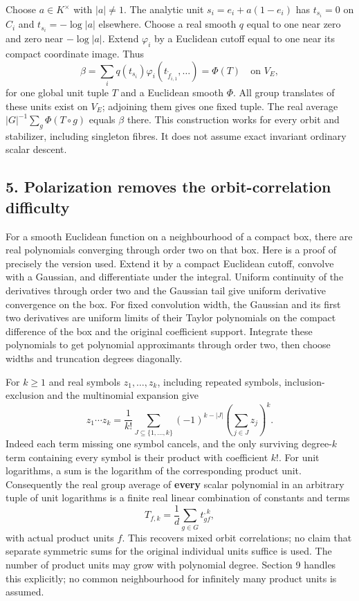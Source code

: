 \documentclass[
  11pt,
]{article}
\begin{document}
Choose \(a\in K^\times\) with \(|a|\ne1\). The analytic unit
\(s_i=e_i+a(1-e_i)\) has \(t_{s_i}=0\) on \(C_i\) and
\(t_{s_i}=-\log|a|\) elsewhere. Choose a real smooth \(q\) equal to one
near zero and zero near \(-\log|a|\). Extend \(\varphi_i\) by a
Euclidean cutoff equal to one near its compact coordinate image. Thus \[
 \beta=\sum_i q(t_{s_i})\varphi_i(t_{\widetilde f_{i,1}},\ldots)
                          =\Phi(T)\quad\text{on }V_E,   \tag{8}
\] for one global unit tuple \(T\) and a Euclidean smooth \(\Phi\). All
group translates of these units exist on \(V_E\); adjoining them gives
one fixed tuple. The real average \(|G|^{-1}\sum_g\Phi(T\circ g)\)
equals \(\beta\) there. This construction works for every orbit and
stabilizer, including singleton fibres. It does not assume exact
invariant ordinary scalar descent.

\subsection{5. Polarization removes the orbit-correlation
difficulty}\label{polarization-removes-the-orbit-correlation-difficulty}

For a smooth Euclidean function on a neighbourhood of a compact box,
there are real polynomials converging through order two on that box.
Here is a proof of precisely the version used. Extend it by a compact
Euclidean cutoff, convolve with a Gaussian, and differentiate under the
integral. Uniform continuity of the derivatives through order two and
the Gaussian tail give uniform derivative convergence on the box. For
fixed convolution width, the Gaussian and its first two derivatives are
uniform limits of their Taylor polynomials on the compact difference of
the box and the original coefficient support. Integrate these
polynomials to get polynomial approximants through order two, then
choose widths and truncation degrees diagonally.

For \(k\ge1\) and real symbols \(z_1,\ldots,z_k\), including repeated
symbols, inclusion-exclusion and the multinomial expansion give \[
 z_1\cdots z_k=\frac1{k!}\sum_{J\subseteq\{1,\ldots,k\}}
            (-1)^{k-|J|}\left(\sum_{j\in J}z_j\right)^k. \tag{9}
\] Indeed each term missing one symbol cancels, and the only surviving
degree-\(k\) term containing every symbol is their product with
coefficient \(k!\). For unit logarithms, a sum is the logarithm of the
corresponding product unit. Consequently the real group average of
\textbf{every} scalar polynomial in an arbitrary tuple of unit
logarithms is a finite real linear combination of constants and terms \[
        T_{f,k}=\frac1d\sum_{g\in G}t_{gf}^{,k},          \tag{10}
\] with actual product units \(f\). This recovers mixed orbit
correlations; no claim that separate symmetric sums for the original
individual units suffice is used. The number of product units may grow
with polynomial degree. Section 9 handles this explicitly; no common
neighbourhood for infinitely many product units is assumed.
\end{document}
